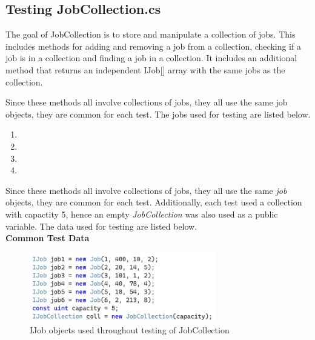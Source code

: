 \documentclass[a4paper]{article}
\begin{document}
\subsection{Testing JobCollection.cs}
The goal of JobCollection is to store and manipulate a collection of jobs. This includes methods for adding and removing a job from a collection, checking if a job is in a collection and finding a job in a collection. It includes an additional method that returns an independent IJob[] array with the same jobs as the collection.

Since these methods all involve collections of jobs, they all use the same job objects, they are common for each test. The jobs used for testing are listed below.
\begin{enumerate}
   \item {}
   \item {}
   \item {}
   \item {}
\end{enumerate}

Since these methods all involve collections of jobs, they all use the same \textit{job} objects, they are common for each test. Additionally, each test used a collection with capactity 5, hence an empty \textit{JobCollection} was also used as a public variable. The data used for testing are listed below.
\\[6pt]
\textbf{Common Test Data}
\begin{figure}[H]
   \centering
   \includegraphics[height=3cm]{images/JobCollection-data.png}
   \caption{IJob objects used throughout testing of JobCollection}
\end{figure}
\end{document}
